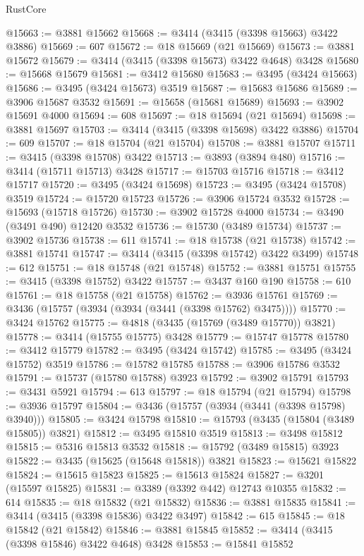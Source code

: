 \begin{lexlean}{RustCore}
\begin{coremodule}
@15663 := @3881 @15662
@15668 := @3414 (@3415 (@3398 @15663) @3422 @3886)
@15669 := 607
@15672 := @18 @15669 (@21 @15669)
@15673 := @3881 @15672
@15679 := @3414 (@3415 (@3398 @15673) @3422 @4648) @3428
@15680 := @15668 @15679
@15681 := @3412 @15680
@15683 := @3495 (@3424 @15663)
@15686 := @3495 (@3424 @15673) @3519
@15687 := @15683 @15686
@15689 := @3906 @15687 @3532
@15691 := @15658 (@15681 @15689)
@15693 := @3902 @15691 @4000
@15694 := 608
@15697 := @18 @15694 (@21 @15694)
@15698 := @3881 @15697
@15703 := @3414 (@3415 (@3398 @15698) @3422 @3886)
@15704 := 609
@15707 := @18 @15704 (@21 @15704)
@15708 := @3881 @15707
@15711 := @3415 (@3398 @15708) @3422
@15713 := @3893 (@3894 @480)
@15716 := @3414 (@15711 @15713) @3428
@15717 := @15703 @15716
@15718 := @3412 @15717
@15720 := @3495 (@3424 @15698)
@15723 := @3495 (@3424 @15708) @3519
@15724 := @15720 @15723
@15726 := @3906 @15724 @3532
@15728 := @15693 (@15718 @15726)
@15730 := @3902 @15728 @4000
@15734 := @3490 (@3491 @490) @12420 @3532
@15736 := @15730 (@3489 @15734)
@15737 := @3902 @15736
@15738 := 611
@15741 := @18 @15738 (@21 @15738)
@15742 := @3881 @15741
@15747 := @3414 (@3415 (@3398 @15742) @3422 @3499)
@15748 := 612
@15751 := @18 @15748 (@21 @15748)
@15752 := @3881 @15751
@15755 := @3415 (@3398 @15752) @3422
@15757 := @3437 @160 @190
@15758 := 610
@15761 := @18 @15758 (@21 @15758)
@15762 := @3936 @15761
@15769 := @3436 (@15757 (@3934 (@3934 (@3441 (@3398 @15762) @3475))))
@15770 := @3424 @15762
@15775 := @4818 (@3435 (@15769 (@3489 @15770)) @3821)
@15778 := @3414 (@15755 @15775) @3428
@15779 := @15747 @15778
@15780 := @3412 @15779
@15782 := @3495 (@3424 @15742)
@15785 := @3495 (@3424 @15752) @3519
@15786 := @15782 @15785
@15788 := @3906 @15786 @3532
@15791 := @15737 (@15780 @15788) @3923
@15792 := @3902 @15791
@15793 := @3431 @5921
@15794 := 613
@15797 := @18 @15794 (@21 @15794)
@15798 := @3936 @15797
@15804 := @3436 (@15757 (@3934 (@3441 (@3398 @15798) @3940)))
@15805 := @3424 @15798
@15810 := @15793 (@3435 (@15804 (@3489 @15805)) @3821)
@15812 := @3495 @15810 @3519
@15813 := @3498 @15812
@15815 := @5316 @15813 @3532
@15818 := @15792 (@3489 @15815) @3923
@15822 := @3435 (@15625 (@15648 @15818)) @3821
@15823 := @15621 @15822
@15824 := @15615 @15823
@15825 := @15613 @15824
@15827 := @3201 (@15597 @15825)
@15831 := @3389 (@3392 @442) @12743 @10355
@15832 := 614
@15835 := @18 @15832 (@21 @15832)
@15836 := @3881 @15835
@15841 := @3414 (@3415 (@3398 @15836) @3422 @3497)
@15842 := 615
@15845 := @18 @15842 (@21 @15842)
@15846 := @3881 @15845
@15852 := @3414 (@3415 (@3398 @15846) @3422 @4648) @3428
@15853 := @15841 @15852

\end{coremodule}
\end{lexlean}
